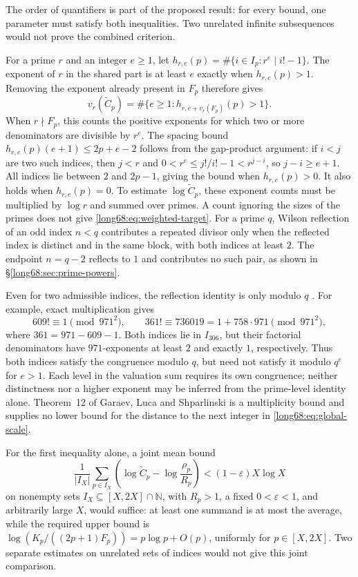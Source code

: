 \documentclass[11pt]{article}
\begin{document}
The order of quantifiers is part of the proposed result: for every bound,
one parameter must satisfy both inequalities. Two unrelated infinite
subsequences would not prove the combined criterion.

For a prime $r$ and an integer $e\ge1$, let
$h_{r,e}(p)=\#\{i\in I_p:r^e\mid i!-1\}$. The exponent of $r$ in the
shared part is at least $e$ exactly when $h_{r,e}(p)>1$.
Removing the exponent already present in $F_p$ therefore gives
\[
 v_r(\widetilde C_p)
 =\#\{e\ge1:h_{r,e+v_r(F_p)}(p)>1\}.
\]
When $r\nmid F_p$, this counts the positive exponents for which two or
more denominators are divisible by $r^e$. The spacing bound
$h_{r,e}(p)(e+1)\le2p+e-2$ follows from the gap-product argument:
if $i<j$ are two such indices, then $j<r$ and
$0<r^e\le j!/i!-1<r^{j-i}$, so $j-i\ge e+1$. All indices lie between
$2$ and $2p-1$, giving the bound when $h_{r,e}(p)>0$. It also holds when $h_{r,e}(p)=0$.
To estimate $\log\widetilde C_p$, these exponent counts must be multiplied
by $\log r$ and summed over primes. A count ignoring the sizes of the
primes does not give \eqref{long68:eq:weighted-target}. For a prime $q$,
Wilson reflection of an odd index $n<q$ contributes a repeated divisor
only when the reflected index is distinct and in the same block, with
both indices at least $2$. The endpoint $n=q-2$ reflects to $1$ and
contributes no such pair, as shown in \S\ref{long68:sec:prime-powers}.

Even for two admissible indices, the reflection identity is only modulo
$q$ \cite[(4), p.~462]{stewart2004}. For example, exact multiplication gives
\[
 609!\equiv1\pmod{971^2},\qquad
 361!\equiv736019=1+758\cdot971\pmod{971^2},
\]
where $361=971-609-1$. Both indices lie in $I_{306}$, but their factorial
denominators have $971$-exponents at least $2$ and exactly $1$, respectively.
Thus both indices satisfy the congruence modulo $q$, but need not satisfy
it modulo $q^e$ for $e>1$. Each level in the valuation sum requires its own
congruence; neither distinctness nor a higher exponent may be inferred
from the prime-level identity alone.
Theorem~12 of Garaev, Luca and Shparlinski
\cite[arXiv v1, Thm.~12, p.~16]{garaev-luca-shparlinski} is a multiplicity
bound and supplies no lower bound for the distance to the next integer in
\eqref{long68:eq:global-scale}.

For the first inequality alone, a joint mean bound
\[
 \frac1{|I_X|}\sum_{p\in I_X}
 \left(\log\widetilde C_p-\log\frac{\rho_p}{R_p}\right)
 <(1-\varepsilon)X\log X
\]
on nonempty sets $I_X\subseteq[X,2X]\cap\mathbb N$, with $R_p>1$, a fixed
$0<\varepsilon<1$, and arbitrarily large $X$, would suffice: at least one
summand is at most the average, while the required upper bound is
$\log(K_p/((2p+1)F_p))=p\log p+O(p)$, uniformly for $p\in[X,2X]$.
Two separate estimates on unrelated sets of indices would not give this
joint comparison.
\end{document}
